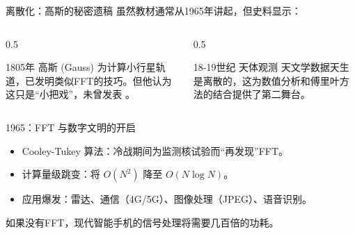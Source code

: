 \documentclass[
  ignorenonframetext,
]{beamer}
\providecommand{\tightlist}{%
  \setlength{\itemsep}{0pt}\setlength{\parskip}{0pt}}
\begin{document}
\begin{frame}{离散化：高斯的秘密遗稿}
\protect{}\label{ux79bbux6563ux5316ux9ad8ux65afux7684ux79d8ux5bc6ux9057ux7a3f}
虽然教材通常从1965年讲起，但史料显示：

\begin{columns}[T]
\begin{column}{0.5\linewidth}
\begin{block}{{1805年 高斯 (Gauss)}}
\protect{}\label{ux5e74-ux9ad8ux65af-gauss}
为计算小行星轨道，已发明类似FFT的技巧。但他认为这只是``小把戏''，未曾发表
。
\end{block}
\end{column}

\begin{column}{0.5\linewidth}
\begin{block}{{18-19世纪 天体观测}}
\protect{}\label{ux4e16ux7eaa-ux5929ux4f53ux89c2ux6d4b}
天文学数据天生是离散的，这为数值分析和傅里叶方法的结合提供了第二舞台。
\end{block}
\end{column}
\end{columns}

\begin{block}{1965：FFT 与数字文明的开启}
\protect{}\label{fft-ux4e0eux6570ux5b57ux6587ux660eux7684ux5f00ux542f}
\begin{itemize}
\tightlist
\item
  {Cooley-Tukey 算法}：冷战期间为监测核试验而``再发现''FFT。
\item
  {计算量级跳变}：将 \(O(N^2)\) 降至 \(O(N \log N)\)。
\item
  {应用爆发}：雷达、通信（4G/5G）、图像处理（JPEG）、语音识别。
\end{itemize}

如果没有FFT，现代智能手机的信号处理将需要几百倍的功耗。
\end{block}
\end{frame}
\end{document}
